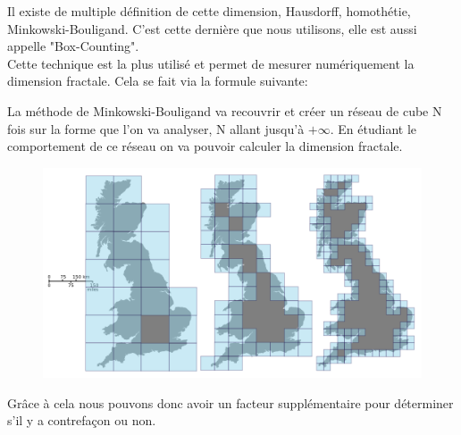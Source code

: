 \documentclass[pdftex,12pt,a4paper]{report}
\begin{document}
Il existe de multiple définition de cette dimension, Hausdorff, homothétie, Minkowski-Bouligand. C'est cette dernière que nous utilisons, elle est aussi appelle "Box-Counting".\\

Cette technique est la plus utilisé et permet de mesurer numériquement la dimension fractale. Cela se fait via la formule suivante:

\vspace{0.3cm}
\begin{center}
\end{center}
\vspace{0.3cm}

La méthode de Minkowski-Bouligand va recouvrir et créer un réseau de cube N fois sur la forme que l'on va analyser, N allant jusqu'à $+\infty$. En étudiant le comportement de ce réseau on va pouvoir calculer la dimension fractale.\\

\begin{figure}[!h]
	\begin{center}
		\includegraphics[scale=0.28]{images/Great_Britain_Box.png}
	\end{center}
\end{figure}

Grâce à cela nous pouvons donc avoir un facteur supplémentaire pour déterminer s'il y a contrefaçon ou non.
\end{document}
